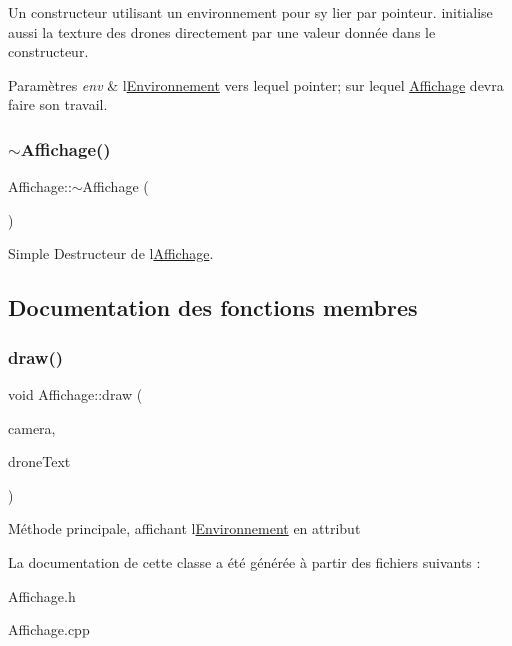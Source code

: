 Un constructeur utilisant un environnement pour s\textquotesingle{}y lier par pointeur. initialise aussi la texture des drones directement par une valeur donnée dans le constructeur. 
\begin{DoxyParams}{Paramètres}
{\em env} & l\textquotesingle{}\mbox{\hyperlink{class_environnement}{Environnement}} vers lequel pointer; sur lequel \mbox{\hyperlink{class_affichage}{Affichage}} devra faire son travail. \\
\hline
\end{DoxyParams}
\mbox{\label{class_affichage_ae6a4f4db7a0d8d2abc8bd44c1be674c0}} 
\subsubsection{\texorpdfstring{$\sim$\+Affichage()}{~Affichage()}}
{\footnotesize\ttfamily Affichage\+::$\sim$\+Affichage (\begin{DoxyParamCaption}{ }\end{DoxyParamCaption})\hspace{0.3cm}{\ttfamily [virtual]}}

Simple Destructeur de l\textquotesingle{}\mbox{\hyperlink{class_affichage}{Affichage}}. 

\subsection{Documentation des fonctions membres}
\mbox{\label{class_affichage_af90570851774c1f36d53ed10fb016f47}} 
\subsubsection{\texorpdfstring{draw()}{draw()}}
{\footnotesize\ttfamily void Affichage\+::draw (\begin{DoxyParamCaption}\item[{\mbox{\hyperlink{class_track_ball_camera}{Track\+Ball\+Camera}} $\ast$}]{camera,  }\item[{G\+Luint}]{drone\+Text }\end{DoxyParamCaption})}

Méthode principale, affichant l\textquotesingle{}\mbox{\hyperlink{class_environnement}{Environnement}} en attribut 

La documentation de cette classe a été générée à partir des fichiers suivants \+:\begin{DoxyCompactItemize}
\item 
Affichage.\+h\item 
Affichage.\+cpp\end{DoxyCompactItemize}

